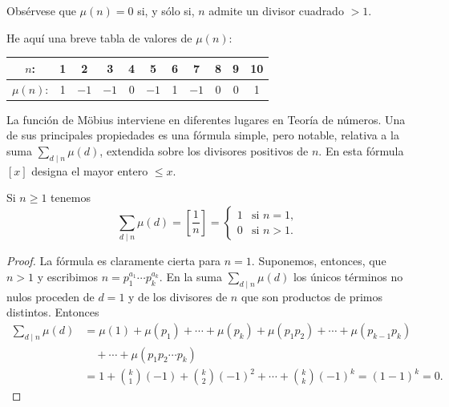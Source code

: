 \documentclass[12pt,a4paper]{book}
\begin{document}
    Obsérvese que $\mu(n)=0$ si, y sólo si, $n$ admite un divisor cuadrado $>1$.

    He aquí una breve tabla de valores de $\mu(n)$:
    \begin{center}
        \begin{tabular}{c|cccccccccc}
            $n$: & 1 & 2 & 3 & 4 & 5 & 6 & 7 & 8 & 9 & 10\\
            \hline
            $\mu(n)$: & 1 & $-1$ & $-1$ & 0 & $-1$ & 1 & $-1$ & 0 & 0 & 1
        \end{tabular}
    \end{center}

    La función de Möbius interviene en diferentes lugares en Teoría de números. Una de sus
    principales propiedades es una fórmula simple, pero notable, relativa a la suma
    $\sum_{d\mid n}\mu(d)$, extendida sobre los divisores positivos de $n$. En esta fórmula
    $[x]$ designa el mayor entero $\leq x$.

    \begin{teorema}
        Si $n\geq1$ tenemos
        \begin{equation*}
            \sum_{d\mid n}\mu(d)=\left[\frac{1}{n}\right]=
            \begin{cases}
                1 & \text{si } n=1,\\
                0 & \text{si } n>1.
            \end{cases}
        \end{equation*}
    \end{teorema}

    \begin{proof}
        La fórmula es claramente cierta para $n=1$. Suponemos, entonces, que $n>1$ y
        escribimos $n=p_{1}^{a_{1}}\cdots p_{k}^{a_{k}}$. En la suma $\sum_{d\mid n}\mu(d)$ los
        únicos términos no nulos proceden de $d=1$ y de los divisores de $n$ que son
        productos de primos distintos. Entonces
        \begin{align*}
            \sum_{d\mid n}\mu(d)&=\mu(1)+\mu(p_{1})+\cdots+\mu(p_{k})+\mu(p_{1}p_{2})+\cdots
            +\mu(p_{k-1}p_{k})\\
            &\quad+\cdots+\mu(p_{1}p_{2}\cdots p_{k})\\
            &=1+\binom{k}{1}(-1)+\binom{k}{2}(-1)^{2}+\cdots+\binom{k}{k}(-1)^{k}=(1-1)^{k}=0.
        \end{align*}
    \end{proof}
\end{document}
